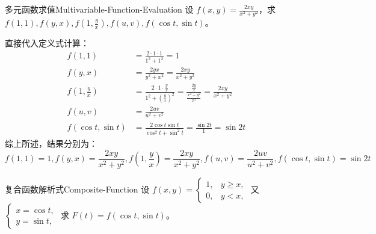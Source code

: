 \begin{problem}{多元函数求值}{Multivariable-Function-Evaluation}
    设 $f(x, y) = \frac{2xy}{x^2+y^2}$，求 $f(1, 1), f(y, x), f(1, \frac{y}{x}), f(u, v), f(\cos t, \sin t)$。
\end{problem}

\begin{solution}
    直接代入定义式计算：
    \begin{equation*}
        \begin{aligned}
            f(1, 1)                        & = \frac{2 \cdot 1 \cdot 1}{1^2 + 1^2} = 1                                                                                                     \\
            f(y, x)                        & = \frac{2yx}{y^2 + x^2} = \frac{2xy}{x^2 + y^2}                                                                                               \\
            f\left( 1, \frac{y}{x} \right) & = \frac{2 \cdot 1 \cdot \frac{y}{x}}{1^2 + \left( \frac{y}{x} \right)^2} = \frac{\frac{2y}{x}}{\frac{x^2 + y^2}{x^2}} = \frac{2xy}{x^2 + y^2} \\
            f(u, v)                        & = \frac{2uv}{u^2 + v^2}                                                                                                                       \\
            f(\cos t, \sin t)              & = \frac{2\cos t \sin t}{\cos^2 t + \sin^2 t} = \frac{\sin 2t}{1} = \sin 2t
        \end{aligned}
    \end{equation*}
    综上所述，结果分别为：
    \begin{equation*}
        \boxed{f(1, 1) = 1, f(y, x) = \frac{2xy}{x^2+y^2}, f\left( 1, \frac{y}{x} \right) = \frac{2xy}{x^2+y^2}, f(u, v) = \frac{2uv}{u^2+v^2}, f(\cos t, \sin t) = \sin 2t}
    \end{equation*}
\end{solution}

\begin{problem}{复合函数解析式}{Composite-Function}
    设 $f(x, y) = \begin{cases} 1, & y \geqslant x, \\ 0, & y < x, \end{cases}$ 又 $\begin{cases} x = \cos t, \\ y = \sin t, \end{cases}$ 求 $F(t) = f(\cos t, \sin t)$。
\end{problem}

